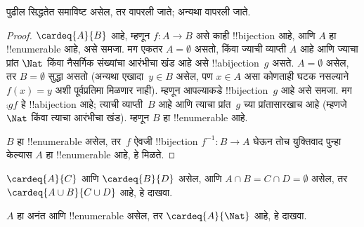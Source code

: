 \documentclass[../../../include/open-logic-section]{subfiles}
\begin{document}
\begin{editorial}
पुढील सिद्धतेत  समाविष्ट असेल, तर
 वापरली जाते; अन्यथा
 वापरली जाते.
\end{editorial}

\begin{proof}
$\cardeq{A}{B}$ आहे, म्हणून $f \colon A
\to B$ असे काही !!{bijection} आहे, आणि $A$ हा !!{enumerable} आहे,
असे समजा.
{
  मग एकतर $A  = \emptyset$ असतो, किंवा ज्याची व्याप्ती $A$ आहे आणि
  ज्याचा प्रांत $\Nat$ किंवा नैसर्गिक संख्यांचा आरंभीचा खंड आहे असे
  !!a{bijection}~$g$ असते. $A = \emptyset$ असेल, तर $B =
  \emptyset$ सुद्धा असतो (अन्यथा एखादा~$y \in B$ असेल, पण $x
  \in A$ असा कोणताही घटक नसल्याने $f(x) = y$ अशी पूर्वप्रतिमा मिळणार
  नाही). म्हणून आपल्याकडे !!{bijection}~$g$ आहे असे समजा. मग
  $\comp{g}{f}$ हे !!a{bijection} आहे; त्याची व्याप्ती~$B$ आहे आणि
  त्याचा प्रांत~$g$ च्या प्रांतासारखाच आहे (म्हणजे $\Nat$ किंवा त्याचा
  आरंभीचा खंड). म्हणून $B$ हा !!{enumerable} आहे.}

$B$ हा !!{enumerable} असेल, तर~$f$ ऐवजी
!!{bijection} $f^{-1}\colon B \to A$ घेऊन तोच युक्तिवाद पुन्हा केल्यास
$A$ हा !!{enumerable} आहे, हे मिळते.
\end{proof}

\begin{prob}
$\cardeq{A}{C}$ आणि $\cardeq{B}{D}$ असेल, आणि $A \cap B =
C \cap D = \emptyset$ असेल, तर $\cardeq{A \cup B}{C \cup D}$ आहे,
हे दाखवा.
\end{prob}

\begin{prob}
$A$ हा अनंत आणि !!{enumerable} असेल, तर $\cardeq{A}{\Nat}$ आहे, हे
दाखवा.
\end{prob}
\end{document}
